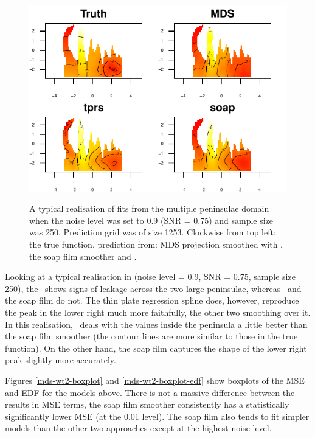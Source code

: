 \begin{figure}
\centering
\includegraphics[width=6in]{mds/figs/wt2-comp-09.pdf} \\
\caption{A typical realisation of fits from the multiple peninsulae domain when the noise level was set to 0.9 (SNR = 0.75) and sample size was 250. Prediction grid was of size 1253. Clockwise from top left: the true function, prediction from: MDS projection smoothed with \tprs, the soap film smoother and \tprs.}
\label{wt2-comp-0.9}
\end{figure}

Looking at a typical realisation in  (noise level = 0.9, SNR = 0.75, sample size 250), the \tprs\ shows signs of leakage across the two large peninsulae, whereas \mdsap\ and the soap film do not. The thin plate regression spline does, however, reproduce the peak in the lower right much more faithfully, the other two smoothing over it. In this realisation, \mdsap\ deals with the values inside the peninsula a little better than the soap film smoother (the contour lines are more similar to those in the true function). On the other hand, the soap film captures the shape of the lower right peak slightly more accurately.

Figures \ref{mds-wt2-boxplot} and \ref{mds-wt2-boxplot-edf} show boxplots of the MSE and EDF for the models above. There is not a massive difference between the results in MSE terms, the soap film smoother consistently has a statistically significantly lower MSE (at the 0.01 level). The soap film also tends to fit simpler models than the other two approaches except at the highest noise level.

